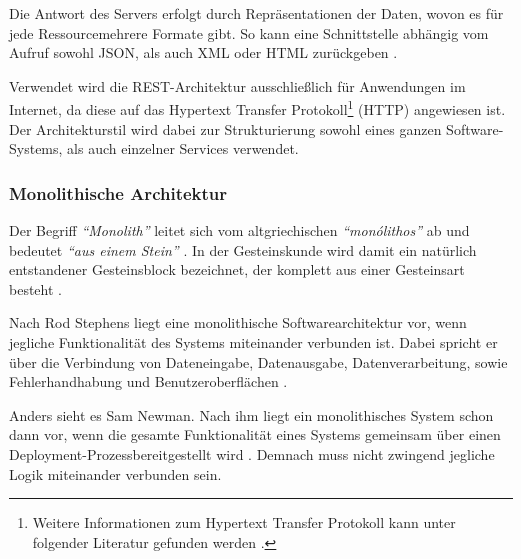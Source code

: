 Die Antwort des Servers erfolgt durch Repräsentationen der Daten, wovon es für jede Ressource\footnotemark mehrere Formate gibt. So kann eine Schnittstelle abhängig vom Aufruf sowohl JSON, als auch XML oder HTML zurückgeben \parencite[vgl.][S. 128]{starke_effektive_2015}.

Verwendet wird die REST-Architektur ausschließlich für Anwendungen im Internet, da diese auf das Hypertext Transfer Protokoll\footnote{Weitere Informationen zum Hypertext Transfer Protokoll kann unter folgender Literatur gefunden werden \parencite{leach_hypertext_2020}.} (HTTP) angewiesen ist. Der Architekturstil wird dabei zur Strukturierung sowohl eines ganzen Software-Systems, als auch einzelner Services verwendet.

\subsubsection{Monolithische Architektur}
\label{sec:monolith}

Der Begriff \textit{\enquote{Monolith}} leitet sich vom altgriechischen \textit{\enquote{monólithos}} ab und bedeutet \textit{\enquote{aus einem Stein}} \parencites[vgl.][]{duden_nodate}[vgl.][]{dwds_nodate}. In der Gesteinskunde wird damit ein natürlich entstandener Gesteinsblock bezeichnet, der komplett aus einer Gesteinsart besteht \parencite[vgl.][]{dwds_nodate}.

Nach Rod Stephens liegt eine monolithische Softwarearchitektur vor, wenn jegliche Funktionalität des Systems miteinander verbunden ist. Dabei spricht er über die Verbindung von Dateneingabe, Datenausgabe, Datenverarbeitung, sowie Fehlerhandhabung und Benutzeroberflächen \parencite[vgl.][S. 94]{stephens_beginning_2015}.

Anders sieht es Sam Newman. Nach ihm liegt ein monolithisches System schon dann vor, wenn die gesamte Funktionalität eines Systems gemeinsam über einen Deployment-Prozess\footnotemark bereitgestellt wird \parencite[vgl.][Kap. 2.2]{newman_monolith_2019}. Demnach muss nicht zwingend jegliche Logik miteinander verbunden sein.


